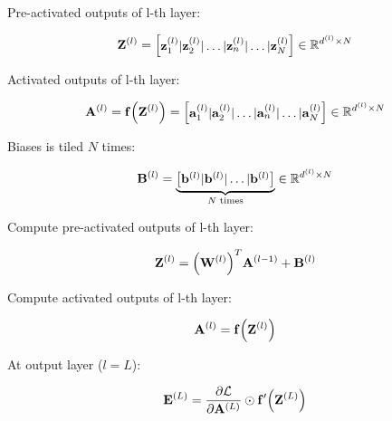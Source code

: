 \documentclass[14pt, a4paper]{article}
\numberwithin{equation}{section}
\numberwithin{algorithm}{section}
\numberwithin{figure}{section}
\begin{document}
Pre-activated outputs of l-th layer:

\begin{equation}
  \bold{Z}^{(l)}=\begin{bmatrix} \bold{z}_1^{(l)} \vert \bold{z}_2^{(l)} \vert \dots \vert \bold{z}_n^{(l)} \vert \dots \vert \bold{z}_N^{(l)} \end{bmatrix} \in \mathbb{R}^{d^{(l)} \times N}
\end{equation}

Activated outputs of l-th layer:

\begin{equation}
  \bold{A}^{(l)}=\bold{f}\Big(\bold{Z}^{(l)}\Big)=\begin{bmatrix} \bold{a}_1^{(l)} \vert \bold{a}_2^{(l)} \vert \dots \vert \bold{a}_n^{(l)} \vert \dots \vert \bold{a}_N^{(l)} \end{bmatrix} \in \mathbb{R}^{d^{(l)} \times N}
\end{equation}

Biases is tiled $N$ times:

\begin{equation}
	\bold{B}^{(l)}=\underbrace{\begin{bmatrix} \bold{b}^{(l)} \vert \bold{b}^{(l)} \vert \dots \vert \bold{b}^{(l)} \end{bmatrix}}_{N\text{ times}} \in \mathbb{R}^{d^{(l)} \times N}
\end{equation}

Compute pre-activated outputs of l-th layer:

\begin{equation}
	\bold{Z}^{(l)}=\Big(\bold{W}^{(l)}\Big)^T\bold{A}^{(l-1)} + \bold{B}^{(l)}
\end{equation}

Compute activated outputs of l-th layer:

\begin{equation}
	\bold{A}^{(l)} = \bold{f} \Big( \bold{Z}^{(l)} \Big)
\end{equation}

At output layer ($l=L$):

\begin{equation}
	\bold{E}^{(L)}=\dfrac{\partial \mathcal{L}}{\partial \bold{A}^{(L)}} \odot \bold{f}^{\prime}\Big( \bold{Z}^{(L)} \Big)
\end{equation}
\end{document}
